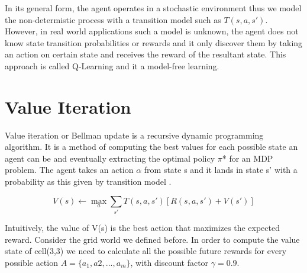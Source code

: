 \documentclass[10pt,a4paper,twocolumn]{article}
\begin{document}
	In its general form, the agent operates in a stochastic environment thus we model the non-determistic process with a transition model such as $T(s,a,s')$. However, in real world applications such a model is unknown, the agent does not know state transition probabilities or rewards and it only discover them by taking an action on certain state and receives the reward of the resultant state. This approach is called Q-Learning and it a model-free learning.
	
	\section{Value Iteration}
	Value iteration or Bellman update is a recursive dynamic programming algorithm. It is a method of computing the best values for each possible state an agent can be and eventually extracting the optimal policy $\pi$* for an MDP problem. The agent takes an action $\alpha$ from state s and it lands in state s’ with a probability as this given by transition model . 
	
	\begin{equation}
		V(s) \leftarrow \max_{a}{ \sum_{s'}T(s,a,s') [R(s,a,s') + V(s')]}
	\end{equation}
	
	Intuitively, the value of V(s) is the best action that maximizes the expected reward. Consider the grid world we defined before. In order to compute the value state of cell(3,3) we need to calculate all the possible future rewards for every possible action $A = \{ a_{1}, a{2}, ..., a_{m} \}$, with discount factor $\gamma = 0.9$.
	
\end{document}

